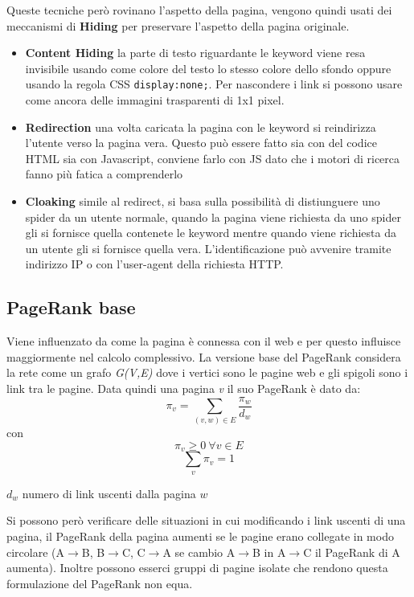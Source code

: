 Queste tecniche però rovinano l'aspetto della pagina, vengono quindi usati dei meccanismi di \textbf{Hiding} per preservare l'aspetto della pagina originale.
\begin{itemize}
\item \textbf{Content Hiding} la parte di testo riguardante le keyword viene resa invisibile usando come colore del testo lo stesso colore dello sfondo oppure usando la regola CSS \texttt{display:none;}.
Per nascondere i link si possono usare come ancora delle immagini trasparenti di 1x1 pixel.
\item \textbf{Redirection} una volta caricata la pagina con le keyword si reindirizza l'utente verso la pagina vera. Questo può essere fatto sia con del codice HTML sia con Javascript, conviene farlo con JS dato che i motori di ricerca fanno più fatica a comprenderlo
\item \textbf{Cloaking} simile al redirect, si basa sulla possibilità di distiunguere uno spider da un utente normale, quando la pagina viene richiesta da uno spider gli si fornisce quella contenete le keyword mentre quando viene richiesta da un utente gli si fornisce quella vera. L'identificazione può avvenire tramite indirizzo IP o con l'user-agent della richiesta HTTP.
\end{itemize}

\subsection{PageRank base}
Viene influenzato da come la pagina è connessa con il web e per questo influisce maggiormente nel calcolo complessivo.
La versione base del PageRank considera la rete come un grafo \textit{G(V,E)} dove i vertici sono le pagine web e gli spigoli sono i link tra le pagine.
Data quindi una pagina \textit{v} il suo PageRank è dato da:
$$ \pi_v = \sum_{(v,w) \in E} \frac{\pi_w}{d_w} $$
con
$$ \pi_v \geq 0 \ \forall v \in E $$ 
$$ \sum_v \pi_v = 1 $$
\begin{center}
$d_w$ numero di link uscenti dalla pagina $w$
\end{center}
Si possono però verificare delle situazioni in cui modificando i link uscenti di una pagina, il PageRank della pagina aumenti se le pagine erano collegate in modo circolare (A$\rightarrow$B, B$\rightarrow$C, C$\rightarrow$A se cambio A$\rightarrow$B in A$\rightarrow$C il PageRank di A aumenta).
Inoltre possono esserci gruppi di pagine isolate che rendono questa formulazione del PageRank non equa.


